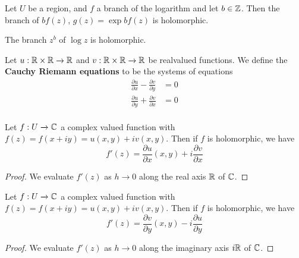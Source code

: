 \begin{lemma}\label{3.2.8}
    Let $U$ be a region, and  $f$ a branch of the logarithm and let  $b \in \mathbb{Z}$.
    Then the branch of  $bf(z)$, $g(z)=\exp{bf(z)}$ is holomorphic.
\end{lemma}
\begin{corollary}
    The branch $z^b$ of  $\log{z}$ is holomorphic.
\end{corollary}

\begin{definition}
    Let $u:\mathbb{R} \times \mathbb{R} \xrightarrow{} \mathbb{R}$ and $v:\mathbb{R} \times \mathbb{R} \xrightarrow{}
    \mathbb{R}$ be realvalued functions. We define the \textbf{Cauchy Riemann equations}
    to be the systems of equations
    \begin{align*}
        \frac{\partial{u}}{\partial{x}}-\frac{\partial{v}}{\partial{y}} &= 0 \\
        \frac{\partial{u}}{\partial{y}}+\frac{\partial{v}}{\partial{x}} &= 0 \\
    \end{align*}
\end{definition}

\begin{lemma}\label{3.2.9}
    Let $f:U \xrightarrow{} \mathbb{C}$ a complex valued function with
    $f(z)=f(x+iy)=u(x,y)+iv(x,y)$. Then if $f$ is holomorphic, we have
    \begin{equation*}
        f'(z)=\frac{\partial{u}}{\partial{x}}(x,y)+i\frac{\partial{v}}{\partial{x}}
    \end{equation*}
\end{lemma}
\begin{proof}
    We evaluate $f'(z)$ as $h \xrightarrow{} 0$ along the real axis $\mathbb{R}$ of
    $\mathbb{C}$.
\end{proof}

\begin{lemma}\label{3.2.10}
    Let $f:U \xrightarrow{} \mathbb{C}$ a complex valued function with
    $f(z)=f(x+iy)=u(x,y)+iv(x,y)$. Then if $f$ is holomorphic, we have
    \begin{equation*}
        f'(z)=\frac{\partial{v}}{\partial{y}}(x,y)-i\frac{\partial{u}}{\partial{y}}
    \end{equation*}
\end{lemma}
\begin{proof}
    We evaluate $f'(z)$ as $h \xrightarrow{} 0$ along the imaginary axis $i\mathbb{R}$
    of $\mathbb{C}$.
\end{proof}

